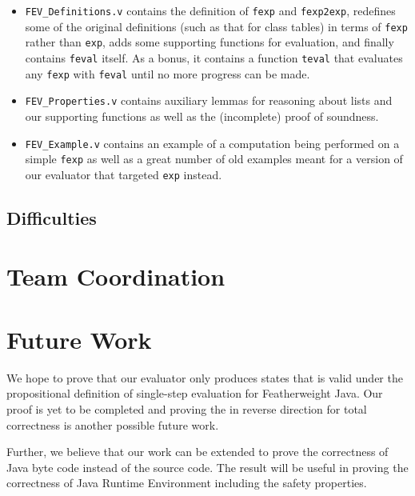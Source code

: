 \documentclass{article}
\begin{document}
\begin{itemize}
	\item \texttt{FEV\_Definitions.v} contains the definition of \texttt{fexp} and \texttt{fexp2exp}, redefines some of the original definitions (such as that for class tables) in terms of \texttt{fexp} rather than \texttt{exp}, adds some supporting functions for evaluation, and finally contains \texttt{feval} itself. As a bonus, it contains a function \texttt{teval} that evaluates any \texttt{fexp} with \texttt{feval} until no more progress can be made.
	
	\item \texttt{FEV\_Properties.v} contains auxiliary lemmas for reasoning about lists and our supporting functions as well as the (incomplete) proof of soundness.
	
	\item \texttt{FEV\_Example.v} contains an example of a computation being performed on a simple \texttt{fexp} as well as a great number of old examples meant for a version of our evaluator that targeted \texttt{exp} instead.
\end{itemize}

\subsection{Difficulties}

\section{Team Coordination}

\section{Future Work}

We hope to prove that our evaluator only produces states that is valid under the propositional definition of single-step evaluation for Featherweight Java. Our proof is yet to be completed and proving the in reverse direction for total correctness is another possible future work.

Further, we believe that our work can be extended to prove the correctness of Java byte code instead of the source code. The result will be useful in proving the correctness of Java Runtime Environment including the safety properties.

{}

\end{document}
